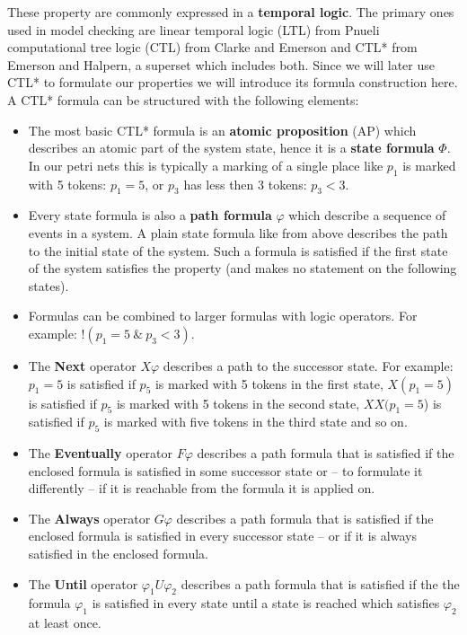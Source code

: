 These property are commonly expressed in a \textbf{temporal logic}.
The primary ones used in model checking are linear temporal logic (LTL) from Pnueli\cite{pnueli1977temporal} computational tree logic (CTL) from Clarke and Emerson\cite{clarke1981design} and CTL* from Emerson and Halpern\cite{emerson1985decision}, a superset which includes both.
Since we will later use CTL* to formulate our properties we will introduce its formula construction here.
A CTL* formula can be structured with the following elements:
\begin{itemize}
  \item The most basic CTL* formula is an \textbf{atomic proposition} (AP) which describes an atomic part of the system state, hence it is a \textbf{state formula} $\Phi$. 
  In our petri nets this is typically a marking of a single place like $p_1$ is marked with 5 tokens: $p_1=5$, or $p_3$ has less then 3 tokens: $p_3<3$.
  \item Every state formula is also a \textbf{path formula} $\varphi$ which describe a sequence of events in a system.
  A plain state formula like from above describes the path to the initial state of the system. Such a formula is satisfied if the first state of the system satisfies the property (and makes no statement on the following states).
  \item Formulas can be combined to larger formulas with logic operators. For example: $!(p_1=5\ \&\ p_3<3)$.
  \item The \textbf{Next} operator $X\varphi$ describes a path to the successor state. For example: $p_1=5$ is satisfied if $p_5$ is marked with 5 tokens in the first state, $X(p_1=5)$ is satisfied if $p_5$ is marked with 5 tokens in the second state, $XX(p_1=5$) is satisfied if $p_5$ is marked with five tokens in the third state and so on.
  \item The \textbf{Eventually} operator $F\varphi$ describes a path formula that is satisfied if the enclosed formula is satisfied in some successor state or -- to formulate it differently -- if it is reachable from the formula it is applied on.
  \item The \textbf{Always} operator $G\varphi$ describes a path formula that is satisfied if the enclosed formula is satisfied in every successor state -- or if it is always satisfied in the enclosed formula.
  \item The \textbf{Until} operator $\varphi_1 U\varphi_2$ describes a path formula that is satisfied if the the formula $\varphi_1$ is satisfied in every state until a state is reached which satisfies $\varphi_2$ at least once.

\end{itemize}
